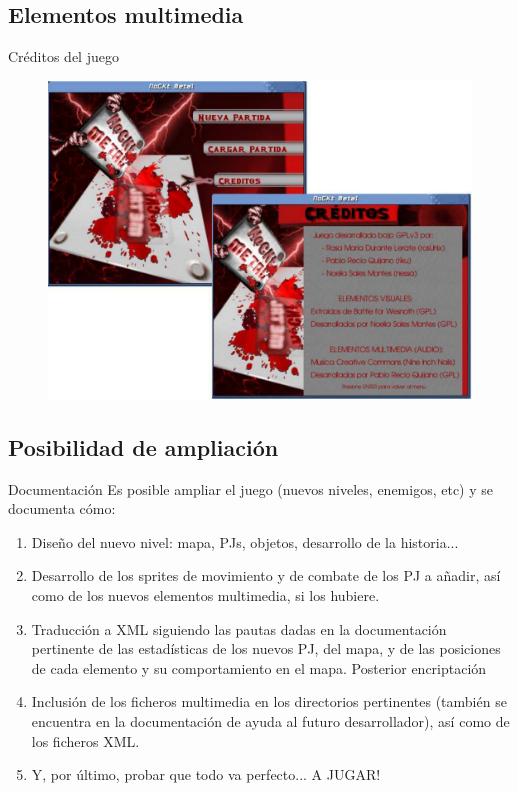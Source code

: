 \documentclass[9pt,xcolor=svgnames]{beamer}
\begin{document}
   \subsection{Elementos multimedia}

   \begin{frame}{Créditos del juego}
   \transdissolve

    \begin{figure}[t]
     \centering
     \includegraphics[scale=0.3]{./Imagenes/creditos.pdf}
    \end{figure}
   \end{frame}



  \subsection{Posibilidad de ampliación}


   \begin{frame}{Documentación}
    Es posible ampliar el juego (nuevos niveles, enemigos, etc) y se
    documenta cómo:

    \begin{enumerate}
     \item Diseño del nuevo nivel: mapa, PJs, objetos, desarrollo de la
	   historia...
     \item Desarrollo de los sprites de movimiento y de combate de los
	   PJ a añadir, así como de los nuevos elementos multimedia, si
	   los hubiere.
     \item Traducción a XML siguiendo las pautas dadas en la
	   documentación pertinente de las estadísticas de los nuevos
	   PJ, del mapa, y de las posiciones de cada elemento y su
	   comportamiento en el mapa. Posterior encriptación
     \item Inclusión de los ficheros multimedia en los directorios
	   pertinentes (también se encuentra en la documentación de
	   ayuda al futuro desarrollador), así como de los ficheros XML.
     \item Y, por último, probar que todo va perfecto... A JUGAR!
    \end{enumerate}
   \end{frame}
\end{document}
